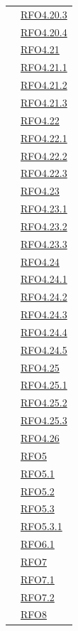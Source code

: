 \begin{longtable}{|>{\centering}m{5cm}|m{5cm}<{\centering}|}
& \hyperlink{RFO4.20.3}{RFO4.20.3}\\
& \hyperlink{RFO4.20.4}{RFO4.20.4}\\
& \hyperlink{RFO4.21}{RFO4.21}\\
& \hyperlink{RFO4.21.1}{RFO4.21.1}\\
& \hyperlink{RFO4.21.2}{RFO4.21.2}\\
& \hyperlink{RFO4.21.3}{RFO4.21.3}\\
& \hyperlink{RFO4.22}{RFO4.22}\\
& \hyperlink{RFO4.22.1}{RFO4.22.1}\\
& \hyperlink{RFO4.22.2}{RFO4.22.2}\\
& \hyperlink{RFO4.22.3}{RFO4.22.3}\\
& \hyperlink{RFO4.23}{RFO4.23}\\
& \hyperlink{RFO4.23.1}{RFO4.23.1}\\
& \hyperlink{RFO4.23.2}{RFO4.23.2}\\
& \hyperlink{RFO4.23.3}{RFO4.23.3}\\
& \hyperlink{RFO4.24}{RFO4.24}\\
& \hyperlink{RFO4.24.1}{RFO4.24.1}\\
& \hyperlink{RFO4.24.2}{RFO4.24.2}\\
& \hyperlink{RFO4.24.3}{RFO4.24.3}\\
& \hyperlink{RFO4.24.4}{RFO4.24.4}\\
& \hyperlink{RFO4.24.5}{RFO4.24.5}\\
& \hyperlink{RFO4.25}{RFO4.25}\\
& \hyperlink{RFO4.25.1}{RFO4.25.1}\\
& \hyperlink{RFO4.25.2}{RFO4.25.2}\\
& \hyperlink{RFO4.25.3}{RFO4.25.3}\\
& \hyperlink{RFO4.26}{RFO4.26}\\
& \hyperlink{RFO5}{RFO5}\\
& \hyperlink{RFO5.1}{RFO5.1}\\
& \hyperlink{RFO5.2}{RFO5.2}\\
& \hyperlink{RFO5.3}{RFO5.3}\\
& \hyperlink{RFO5.3.1}{RFO5.3.1}\\
& \hyperlink{RFO6.1}{RFO6.1}\\
& \hyperlink{RFO7}{RFO7}\\
& \hyperlink{RFO7.1}{RFO7.1}\\
& \hyperlink{RFO7.2}{RFO7.2}\\
& \hyperlink{RFO8}{RFO8}\\

\end{longtable}
